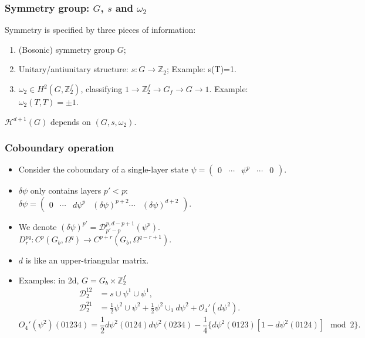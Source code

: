 \documentclass[xcolor=table, aspectratio=169]{beamer}
\begin{document}
\begin{frame}
  \frametitle{Symmetry group: $G$, $s$ and $\omega_2$}
  Symmetry is specified by three pieces of information:
    \begin{enumerate}
    \item (Bosonic) symmetry group $G$;
    \item Unitary/antiunitary structure: $s:G\rightarrow \mathbb Z_2$; Example: s(T)=1.
    \item $\omega_2\in H^2(G, \mathbb Z_2^f)$, classifying $1\rightarrow\mathbb Z_2^f\rightarrow G_f\rightarrow G\rightarrow1$. Example: $\omega_2(T, T)=\pm1$.
    \end{enumerate}
	$\mathcal H^{d+1}(G)$ depends on $(G, s, \omega_2)$.
\end{frame}

\begin{frame}
	\frametitle{Coboundary operation}
	\begin{itemize}
		\item Consider the coboundary of a single-layer state
		$\psi = \begin{pmatrix}0&\cdots&\psi^p&\cdots&0\end{pmatrix}$.
		\item $\delta\psi$ only contains layers $p'<p$:
		$\delta\psi=\begin{pmatrix}0&\cdots&d\psi^p&(\delta\psi)^{p+2}\cdots&(\delta\psi)^{d+2}\end{pmatrix}$.
		\item We denote $(\delta\psi)^{p'}=\mathcal D^{p, d-p+1}_{p'-p}(\psi^p)$.
		$D^{pq}_r:C^p(G_b,\Omega^q)\rightarrow C^{p+r}(G_b,\Omega^{q-r+1})$.
		\item $d$ is like an upper-triangular matrix.
		\item Examples: in 2d, $G=G_b\times\mathbb Z_2^f$
		\begin{align*}
			\mathcal D_2^{12} &= s\cup\psi^1\cup\psi^1,\\
		  \mathcal D_2^{21} &= \frac12\psi^2\cup\psi^2
		  +\frac12\psi^2\cup_1d\psi^2
		  +\mathcal O_4'(d\psi^2).
		\end{align*}
		\[  O_4'(\psi^2)(01234)
		  =\frac12d\psi^2(0124)d\psi^2(0234)
		  -\frac14\{d\psi^2(0123)[1-d\psi^2(0124)] \mod 2\}.\]
	\end{itemize}
\end{frame}
\end{document}
